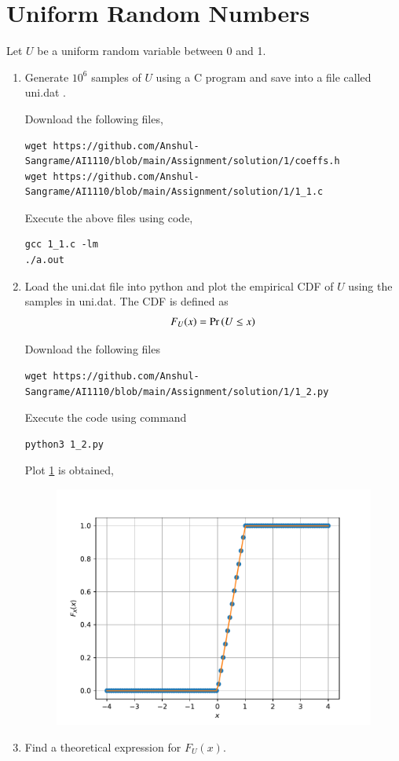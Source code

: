 \documentclass[journal,12pt,twocolumn]{IEEEtran}
\renewcommand\thesection{\arabic{section}}
\begin{document}
\section{Uniform Random Numbers}
Let $U$ be a uniform random variable between 0 and 1.
\begin{enumerate}[label=\thesection.\arabic*
,ref=\thesection.\theenumi]
\item Generate $10^6$ samples of $U$ using a C program and save into a file called uni.dat .

	\solution 

Download the following files,
\begin{lstlisting}
wget https://github.com/Anshul-Sangrame/AI1110/blob/main/Assignment/solution/1/coeffs.h
wget https://github.com/Anshul-Sangrame/AI1110/blob/main/Assignment/solution/1/1_1.c
\end{lstlisting}
Execute the above files using code,
\begin{lstlisting}
gcc 1_1.c -lm
./a.out
\end{lstlisting}
%
\item
Load the uni.dat file into python and plot the empirical CDF of $U$ using the samples in uni.dat. The CDF is defined as
\begin{align}
F_{U}(x) = \Pr\left(U \leq x\right)
\end{align}

	\solution  
	
Download the following files
\begin{lstlisting}
wget https://github.com/Anshul-Sangrame/AI1110/blob/main/Assignment/solution/1/1_2.py
\end{lstlisting}
Execute the code using command
\begin{lstlisting}
python3 1_2.py
\end{lstlisting}
Plot \ref{fig:1.3} is obtained,
\begin{figure}[!ht]
	\centering
	\includegraphics[width=\columnwidth]{../figs/uni_cdf.pdf}
	\caption{}
	\label{fig:1.3}
\end{figure}
%
\item
Find a theoretical expression for $F_{U}(x)$.


\end{enumerate}
\end{document}
